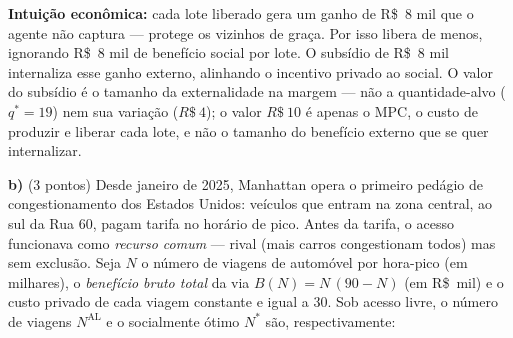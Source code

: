 \begin{solucao}
\textbf{Intui\c{c}\~ao econ\^omica:} cada lote liberado gera um ganho de R\$~8 mil que o agente n\~ao captura --- protege os vizinhos de gra\c{c}a. Por isso libera de menos, ignorando R\$~8 mil de benef\'icio social por lote. O subs\'idio de R\$~8 mil internaliza esse ganho externo, alinhando o incentivo privado ao social. O valor do subs\'idio \'e o tamanho da externalidade na margem --- n\~ao a quantidade-alvo ($q^{*}=19$) nem sua varia\c{c}\~ao ($R\$~4$); o valor $R\$~10$ \'e apenas o $\text{MPC}$, o custo de produzir e liberar cada lote, e n\~ao o tamanho do benef\'icio externo que se quer internalizar.
\end{solucao}

\textbf{b)} (3 pontos) Desde janeiro de 2025, Manhattan opera o primeiro ped\'agio de congestionamento dos Estados Unidos: ve\'iculos que entram na zona central, ao sul da Rua 60, pagam tarifa no hor\'ario de pico. Antes da tarifa, o acesso funcionava como \emph{recurso comum} --- rival (mais carros congestionam todos) mas sem exclus\~ao. Seja $N$ o n\'umero de viagens de autom\'ovel por hora-pico (em milhares), o \emph{benef\'icio bruto total} da via $B(N)=N\,(90-N)$ (em R\$~mil) e o custo privado de cada viagem constante e igual a $30$. Sob acesso livre, o n\'umero de viagens $N^{\text{AL}}$ e o socialmente \'otimo $N^{*}$ s\~ao, respectivamente:

